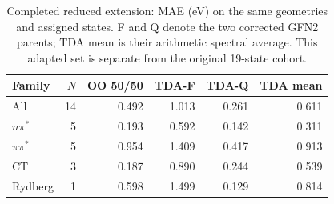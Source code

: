 \begin{table}[!htbp]
\centering\small
\caption{Completed reduced extension: MAE (eV) on the same geometries and assigned states. F and Q denote the two corrected GFN2 parents; TDA mean is their arithmetic spectral average. This adapted set is separate from the original 19-state cohort.}\label{tab:extension}
\begin{tabular}{lrrrrr}
\toprule
Family & $N$ & OO 50/50 & TDA-F & TDA-Q & TDA mean \\
\midrule
All & 14 & 0.492 & 1.013 & 0.261 & 0.611 \\
$n\pi^*$ & 5 & 0.193 & 0.592 & 0.142 & 0.311 \\
$\pi\pi^*$ & 5 & 0.954 & 1.409 & 0.417 & 0.913 \\
CT & 3 & 0.187 & 0.890 & 0.244 & 0.539 \\
Rydberg & 1 & 0.598 & 1.499 & 0.129 & 0.814 \\
\bottomrule
\end{tabular}
\end{table}
